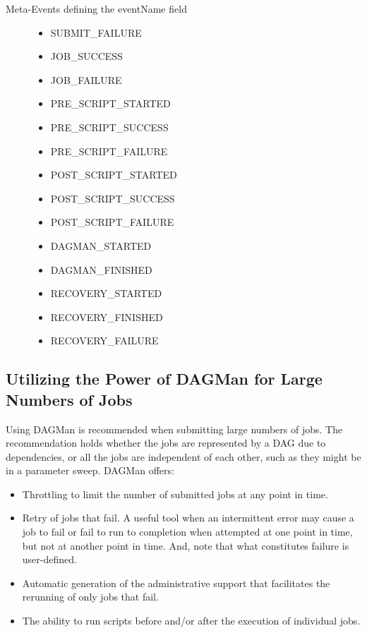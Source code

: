 \begin{description}
\item[Meta-Events defining the eventName field]
\begin{itemize}
\item SUBMIT\_FAILURE
\item JOB\_SUCCESS
\item JOB\_FAILURE
\item PRE\_SCRIPT\_STARTED
\item PRE\_SCRIPT\_SUCCESS
\item PRE\_SCRIPT\_FAILURE
\item POST\_SCRIPT\_STARTED
\item POST\_SCRIPT\_SUCCESS
\item POST\_SCRIPT\_FAILURE
\item DAGMAN\_STARTED
\item DAGMAN\_FINISHED
\item RECOVERY\_STARTED
\item RECOVERY\_FINISHED
\item RECOVERY\_FAILURE
\end{itemize}
\end{description}


\subsection{\label{sec:DAGLotsaJobs}Utilizing the Power of DAGMan for Large Numbers of Jobs}

Using DAGMan is recommended when submitting large numbers of jobs.
The recommendation holds whether the jobs are represented by
a DAG due to dependencies, or all the jobs are
independent of each other, such as they might be in a parameter sweep.
DAGMan offers:
\begin{itemize}
\item{Throttling}
  to limit the number of submitted jobs at any point in time.
\item{Retry of jobs that fail.}
  A useful tool when an intermittent error may cause a job to fail
  or fail to run to completion when attempted at one point in time,
  but not at another point in time.
  And, note that what constitutes failure is user-defined.
\item{Automatic generation of the administrative support that facilitates the
  rerunning of only jobs that fail.}
\item{The ability to run scripts before and/or after the execution of
individual jobs.}
\end{itemize}

